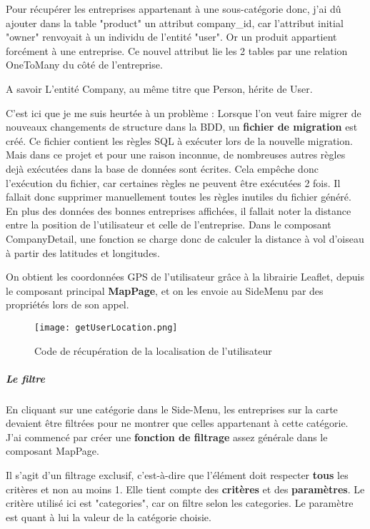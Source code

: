 Pour récupérer les entreprises appartenant à une sous-catégorie donc, j'ai dû ajouter dans la table "product" un attribut company\_id, car l'attribut initial "owner" renvoyait à un individu de l'entité "user". 
Or un produit appartient forcément à une entreprise. 
Ce nouvel attribut lie les 2 tables par une relation OneToMany du côté de l'entreprise.

\begin{callout}{A savoir}
    L'entité Company, au même titre que Person, hérite de User.
\end{callout}

C'est ici que je me suis heurtée à un problème : Lorsque l'on veut faire migrer de nouveaux changements de structure dans la BDD, un \textbf{fichier de migration} est créé.
Ce fichier contient les règles SQL à exécuter lors de la nouvelle migration. Mais dans ce projet et pour une raison inconnue, de nombreuses autres règles dejà exécutées dans la base de données sont écrites.
Cela empêche donc l'exécution du fichier, car certaines règles ne peuvent être exécutées 2 fois. Il fallait donc supprimer manuellement toutes les règles inutiles du fichier généré.\\

En plus des données des bonnes entreprises affichées, il fallait noter la distance entre la position de l'utilisateur et celle de l'entreprise. 
Dans le composant CompanyDetail, une fonction se charge donc de calculer la distance à vol d'oiseau à partir des latitudes et longitudes.

On obtient les coordonnées GPS de l'utilisateur grâce à la librairie Leaflet, depuis le composant principal \textbf{MapPage}, et on les envoie au SideMenu par des propriétés lors de son appel.

\begin{figure}[H]
    \texttt{[image: getUserLocation.png]}
    \caption{Code de récupération de la localisation de l'utilisateur}
\end{figure}

\subparagraph{Le filtre}

En cliquant sur une catégorie dans le Side-Menu, les entreprises sur la carte devaient être filtrées pour ne montrer que celles appartenant à cette catégorie.\\
J'ai commencé par créer une \textbf{fonction de filtrage} assez générale dans le composant MapPage. 

Il s'agit d'un filtrage exclusif, c'est-à-dire que l'élément doit respecter \textbf{tous} les critères et non au moins 1.
Elle tient compte des \textbf{critères} et des \textbf{paramètres}. Le critère utilisé ici est "categories", car on filtre selon les categories.
Le paramètre est quant à lui la valeur de la catégorie choisie.

